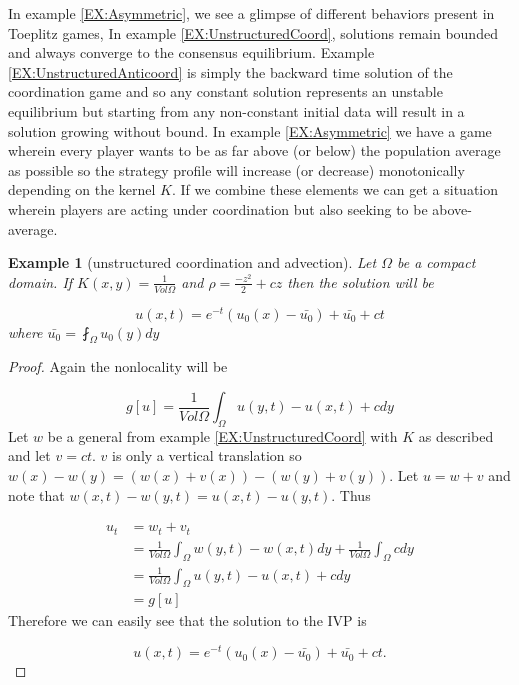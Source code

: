 \documentclass[aps,
preprint,
groupedaddress,
showkeys,
amsmath]{revtex4-2}
\newtheorem{example}{Example}
\begin{document}
    In example \ref{EX:Asymmetric}, we see a glimpse of different behaviors present in Toeplitz games, In example \ref{EX:UnstructuredCoord}, solutions remain bounded and always converge to the consensus equilibrium. Example \ref{EX:UnstructuredAnticoord} is simply the backward time solution of the coordination game and so any constant solution represents an unstable equilibrium but starting from any non-constant initial data will result in a solution growing without bound. In example \ref{EX:Asymmetric} we have a game wherein every player wants to be as far above (or below) the population average as possible so the strategy profile will increase (or decrease) monotonically depending on the kernel $K$. If we combine these elements we can get a situation wherein players are acting under coordination but also seeking to be above-average. 

    \begin{example}[unstructured coordination and advection]\label{EX:UnstructuredAsymmetricCoord}
        Let $\Omega$ be a compact domain. If $K(x,y)=\frac{1}{Vol{\Omega}}$ and $\rho=\frac{-z^2}{2}+cz$ then the solution will be
        
       \[u(x,t)=e^{-t}(u_0(x)-\bar{u_0})+\bar{u_0}+ct\] where $\bar{u_0}=\fint_\Omega u_0(y)dy$
    \end{example}
    \begin{proof}
        Again the nonlocality will be
        
       \[g[u]=\frac{1}{Vol\Omega}\int_\Omega u(y,t)-u(x,t)+cdy\]
       Let $w$ be a general from example \ref{EX:UnstructuredCoord} with $K$ as described and let $v=ct$. $v$ is only a vertical translation so $w(x)-w(y)=(w(x)+v(x))-(w(y)+v(y))$. Let $u=w+v$ and note that $w(x,t)-w(y,t)=u(x,t)-u(y,t)$. Thus 

       \begin{equation*}
       \begin{split}u_t&=w_t+v_t\\
       &=\frac{1}{Vol \Omega}\int_\Omega w(y,t)-w(x,t)dy+\frac{1}{Vol \Omega}\int_\Omega c dy \\
       &=\frac{1}{Vol\Omega}\int_{\Omega}u(y,t)-u(x,t)+c dy\\
       &= g[u]
       \end{split}
       \end{equation*}
        Therefore we can easily see that the solution to the IVP is
        
       \[u(x,t)=e^{-t}\left( u_0(x)- \bar{u_0}\right)+ \bar{u_0}+ct.\]
    \end{proof}
\end{document}
